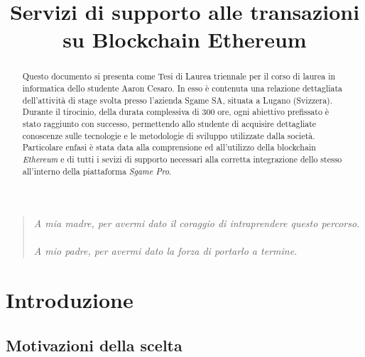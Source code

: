 \documentclass[11pt]{thesistemp}
\title{Servizi di supporto alle transazioni su Blockchain Ethereum}
\begin{document}
\maketitle
\leavevmode\thispagestyle{empty}\newpage
\leavevmode\thispagestyle{empty}\newpage
\begin{quote}
	\textit{A mia madre, per avermi dato il coraggio di intraprendere questo percorso.\\\\
	A mio padre, per avermi dato la forza di portarlo a termine.}
\end{quote}
\leavevmode\thispagestyle{empty}\newpage
\leavevmode\thispagestyle{empty}\newpage
\leavevmode\thispagestyle{empty}\newpage
\begin{abstract}
Questo documento si presenta come Tesi di Laurea triennale per il corso di laurea in informatica dello studente Aaron Cesaro. In esso \`e contenuta una relazione dettagliata dell’attivit\`a di stage svolta presso l’azienda Sgame SA, situata a Lugano (Svizzera). Durante il tirocinio, della durata complessiva di 300 ore, ogni abiettivo prefissato \`e stato raggiunto con successo, permettendo allo studente di acquisire dettagliate conoscenze sulle tecnologie e le metodologie di sviluppo utilizzate dalla società.
Particolare enfasi è stata data alla comprensione ed all'utilizzo della blockchain \textit{Ethereum} e di tutti i sevizi di supporto necessari alla corretta integrazione dello stesso all'interno della piattaforma \textit{Sgame Pro}.
\end{abstract}

\tableofcontents


\section{Introduzione}

\subsection{Motivazioni della scelta}
\end{document}
